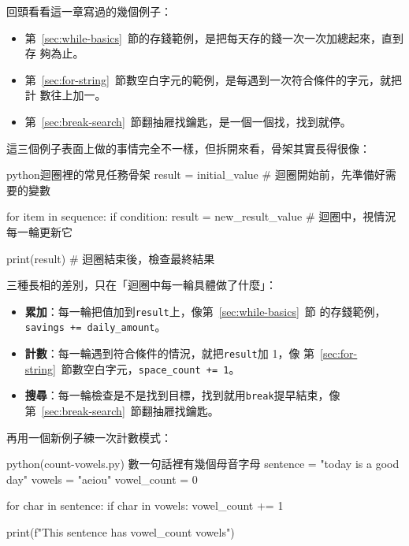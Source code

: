 回頭看看這一章寫過的幾個例子：

\begin{itemize}
\item 第~\ref{sec:while-basics}~節的存錢範例，是把每天存的錢一次一次加總起來，直到存
夠為止。
\item 第~\ref{sec:for-string}~節數空白字元的範例，是每遇到一次符合條件的字元，就把計
數往上加一。
\item 第~\ref{sec:break-search}~節翻抽屜找鑰匙，是一個一個找，找到就停。
\end{itemize}

這三個例子表面上做的事情完全不一樣，但拆開來看，骨架其實長得很像：

\begin{code}{python}{迴圈裡的常見任務骨架}
result = initial_value    # 迴圈開始前，先準備好需要的變數

for item in sequence:
    if condition:
        result = new_result_value   # 迴圈中，視情況每一輪更新它

print(result)              # 迴圈結束後，檢查最終結果
\end{code}

三種長相的差別，只在「迴圈中每一輪具體做了什麼」：

\begin{itemize}
\item \textbf{累加}：每一輪把值加到\texttt{result}上，像第~\ref{sec:while-basics}~節
的存錢範例，\texttt{savings += daily\_amount}。
\item \textbf{計數}：每一輪遇到符合條件的情況，就把\texttt{result}加 1，像
第~\ref{sec:for-string}~節數空白字元，\texttt{space\_count += 1}。
\item \textbf{搜尋}：每一輪檢查是不是找到目標，找到就用\texttt{break}提早結束，像
第~\ref{sec:break-search}~節翻抽屜找鑰匙。
\end{itemize}

再用一個新例子練一次計數模式：

\begin{example}{python}{(count-vowels.py) 數一句話裡有幾個母音字母}
sentence = "today is a good day"
vowels = "aeiou"
vowel_count = 0

for char in sentence:
    if char in vowels:
        vowel_count += 1

print(f"This sentence has {vowel_count} vowels")
\end{example}


